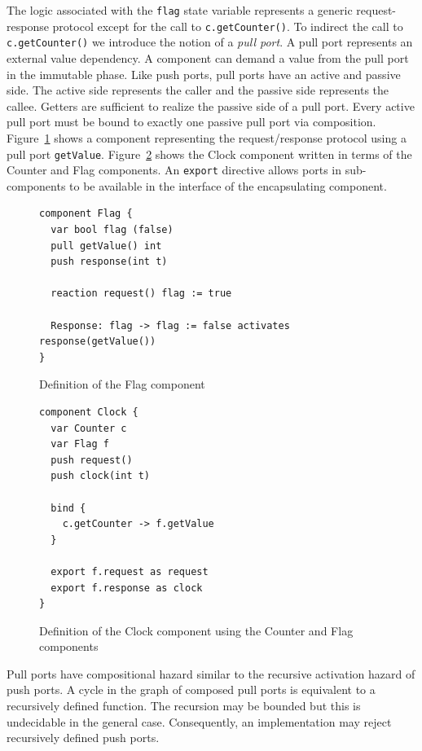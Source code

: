 The logic associated with the \verb+flag+ state variable represents a generic request-response protocol except for the call to \verb+c.getCounter()+.
To indirect the call to \verb+c.getCounter()+ we introduce the notion of a \emph{pull port}.
A pull port represents an external value dependency.
A component can demand a value from the pull port in the immutable phase.
Like push ports, pull ports have an active and passive side.
The active side represents the caller and the passive side represents the callee.
Getters are sufficient to realize the passive side of a pull port.
Every active pull port must be bound to exactly one passive pull port via composition.
Figure~\ref{flag_component} shows a component representing the request/response protocol using a pull port \verb+getValue+.
Figure~\ref{factored2_clock_component} shows the Clock component written in terms of the Counter and Flag components.
An \verb+export+ directive allows ports in sub-components to be available in the interface of the encapsulating component.

\begin{figure}
\begin{verbatim}
component Flag {
  var bool flag (false)
  pull getValue() int
  push response(int t)

  reaction request() flag := true

  Response: flag -> flag := false activates response(getValue())
}
\end{verbatim}
\caption{Definition of the Flag component\label{flag_component}}
\end{figure}

\begin{figure}
\begin{verbatim}
component Clock {
  var Counter c
  var Flag f
  push request()
  push clock(int t)

  bind {
    c.getCounter -> f.getValue
  }

  export f.request as request
  export f.response as clock
}
\end{verbatim}
\caption{Definition of the Clock component using the Counter and Flag components\label{factored2_clock_component}}
\end{figure}

Pull ports have compositional hazard similar to the recursive activation hazard of push ports.
A cycle in the graph of composed pull ports is equivalent to a recursively defined function.
The recursion may be bounded but this is undecidable in the general case.
Consequently, an implementation may reject recursively defined push ports.

